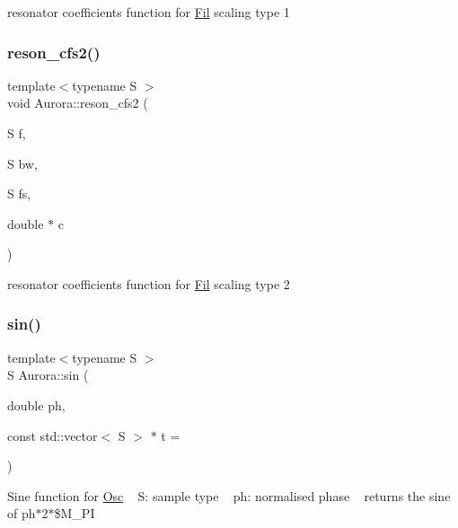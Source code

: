 resonator coefficients function for \hyperlink{class_aurora_1_1_fil}{Fil} scaling type 1 \mbox{\label{namespace_aurora_a797ddf91c14611eaea1c55f901f40cbf}} 
\subsubsection{\texorpdfstring{reson\+\_\+cfs2()}{reson\_cfs2()}}
{\footnotesize\ttfamily template$<$typename S $>$ \\
void Aurora\+::reson\+\_\+cfs2 (\begin{DoxyParamCaption}\item[{S}]{f,  }\item[{S}]{bw,  }\item[{S}]{fs,  }\item[{double $\ast$}]{c }\end{DoxyParamCaption})\hspace{0.3cm}{\ttfamily [inline]}}

resonator coefficients function for \hyperlink{class_aurora_1_1_fil}{Fil} scaling type 2 \mbox{\label{namespace_aurora_a76909b8c5d5801213d35fffa69499885}} 
\subsubsection{\texorpdfstring{sin()}{sin()}}
{\footnotesize\ttfamily template$<$typename S $>$ \\
S Aurora\+::sin (\begin{DoxyParamCaption}\item[{double}]{ph,  }\item[{const std\+::vector$<$ S $>$ $\ast$}]{t = {} }\end{DoxyParamCaption})\hspace{0.3cm}{\ttfamily [inline]}}

Sine function for \hyperlink{class_aurora_1_1_osc}{Osc} ~\newline
S\+: sample type ~\newline
ph\+: normalised phase ~\newline
returns the sine of ph$\ast$2$\ast$\$\+M\+\_\+\+PI \mbox{\label{namespace_aurora_a384371636fb98d2845ddc7619acefd0b}} 
